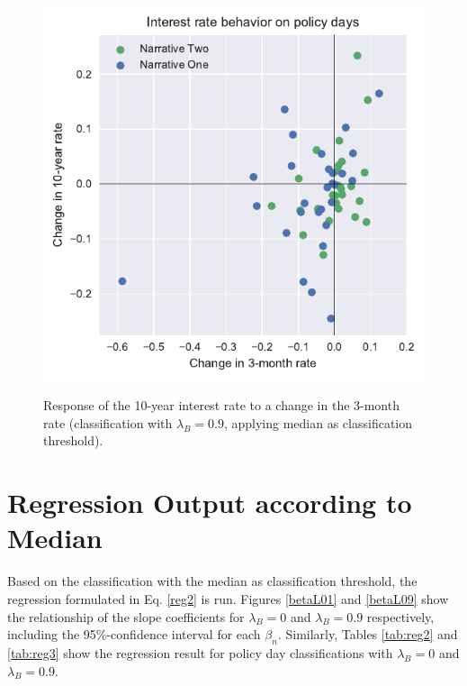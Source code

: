 \documentclass[11pt,a4paper,english,oneside]{book}
\numberwithin{equation}{chapter}
\begin{document}
\begin{figure}
	\caption{Response of the 10-year interest rate to a change in the 3-month rate (classification with $\lambda_B=0.9$, applying median as classification threshold).}
	\centering
	\includegraphics[scale=1]{Images/ChangePlotmod_L0_9.pdf}
	\label{Change02mod_L09}
\end{figure}

\section{Regression Output according to Median}\label{AppendixE2}

Based on the classification with the median as classification threshold, the regression formulated in Eq. \ref{reg2} is run. Figures \ref{betaL01} and \ref{betaL09} show the relationship of the slope coefficients for $\lambda_B=0$ and $\lambda_B=0.9$ respectively, including the 95\%-confidence interval for each $\beta_n$. Similarly, Tables \ref{tab:reg2} and \ref{tab:reg3}  show the regression result for policy day classifications with $\lambda_B=0$ and $\lambda_B=0.9$.
\end{document}
